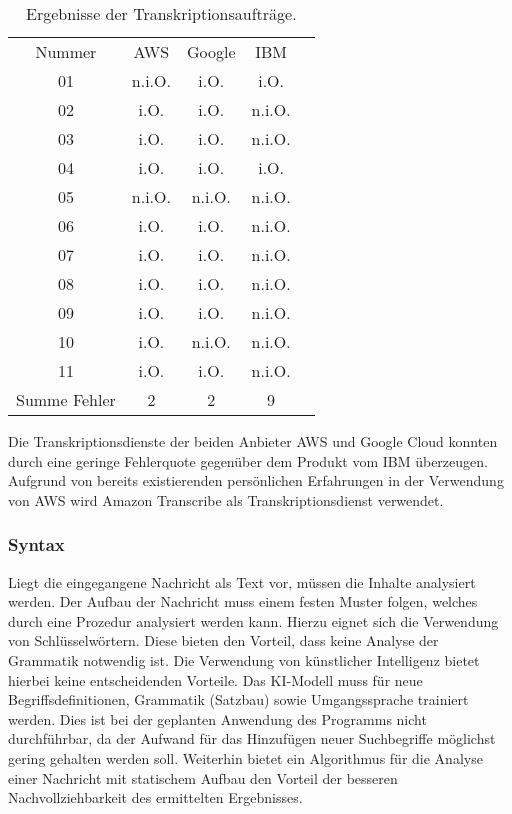\begin{table}[hb!]
\centering
\begin{tabular}{ccccc}
Nummer 		& AWS	& Google		& IBM \\
01			& n.i.O.	& i.O.		& i.O. \\
02			& i.O.	& i.O.		& n.i.O. \\
03			& i.O.	& i.O.		& n.i.O. \\
04			& i.O.	& i.O.		& i.O. \\
05			& n.i.O.	& n.i.O.		& n.i.O. \\
06			& i.O.	& i.O.		& n.i.O. \\
07			& i.O.	& i.O.		& n.i.O. \\
08			& i.O.	& i.O.		& n.i.O. \\
09			& i.O.	& i.O.		& n.i.O. \\
10			& i.O.	& n.i.O.		& n.i.O. \\
11			& i.O.	& i.O.		& n.i.O. \\
\hline
Summe Fehler	& 2		& 2			& 9
\end{tabular}
\caption{Ergebnisse der Transkriptionsaufträge.}
\label{tab:erg-transkript}
\end{table}

Die Transkriptionsdienste der beiden Anbieter AWS und Google Cloud konnten durch eine geringe Fehlerquote gegenüber dem Produkt vom IBM überzeugen. Aufgrund von bereits existierenden persönlichen Erfahrungen in der Verwendung von AWS wird Amazon Transcribe als Transkriptionsdienst verwendet.

\subsubsection{Syntax}
\label{sec:syntax}

Liegt die eingegangene Nachricht als Text vor, müssen die Inhalte analysiert werden. Der Aufbau der Nachricht muss einem festen Muster folgen, welches durch eine Prozedur analysiert werden kann. Hierzu eignet sich die Verwendung von Schlüsselwörtern. Diese bieten den Vorteil, dass keine Analyse der Grammatik notwendig ist. Die Verwendung von künstlicher Intelligenz bietet hierbei keine entscheidenden Vorteile. Das KI-Modell muss für neue Begriffsdefinitionen, Grammatik (Satzbau) sowie Umgangssprache trainiert werden. Dies ist bei der geplanten Anwendung des Programms nicht durchführbar, da der Aufwand für das Hinzufügen neuer Suchbegriffe möglichst gering gehalten werden soll. Weiterhin bietet ein Algorithmus für die Analyse einer Nachricht mit statischem Aufbau den Vorteil der besseren Nachvollziehbarkeit des ermittelten Ergebnisses.

